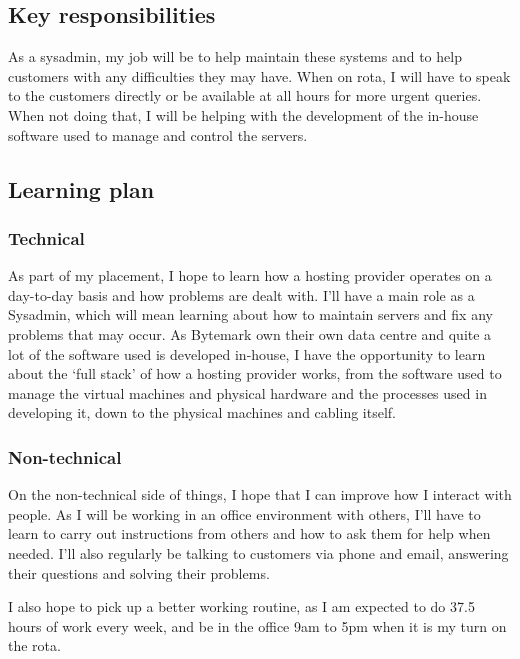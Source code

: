 \documentclass[12pt,a4paper]{article}
\begin{document}
\subsection*{Key responsibilities}
	As a sysadmin, my job will be to help maintain these systems and to help
	customers with any difficulties they may have. When on rota, I will have to
	speak to the customers directly or be available at all hours for more
	urgent queries. When not doing that, I will be helping with the development
	of the in-house software used to manage and control the servers.

\subsection*{Learning plan}
\subsubsection*{Technical}
	As part of my placement, I hope to learn how a hosting provider operates on
	a day-to-day basis and how problems are dealt with. I'll have a main role
	as a Sysadmin, which will mean learning about how to maintain servers and
	fix any problems that may occur.
	As Bytemark own their own data centre and quite a lot of the software used
	is developed in-house, I have the opportunity to learn about the
	`full stack' of how a hosting provider works, from the software used to
	manage the virtual machines and physical hardware and the processes used in
	developing it, down to the physical machines and cabling itself.

\subsubsection*{Non-technical}
	On the non-technical side of things, I hope that I can improve how I
	interact with people. As I will be working in an office environment with
	others, I'll have to learn to carry out instructions from others and how to
	ask them for help when needed. I'll also regularly be talking to customers
	via phone and email, answering their questions and solving their problems.

	I also hope to pick up a better working routine, as I am expected to do
	37.5 hours of work every week, and be in the office 9am to 5pm when it is
	my turn on the rota.
\end{document}
